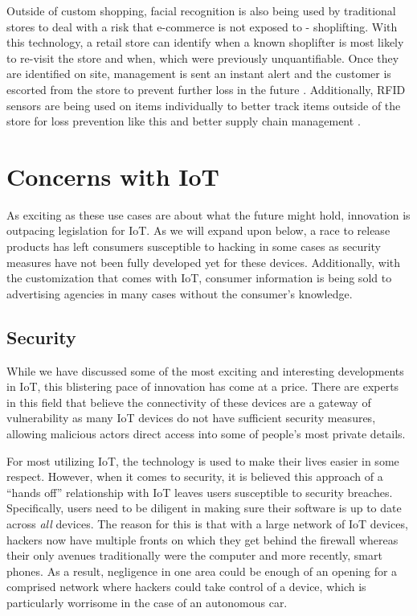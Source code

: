 \documentclass[sigconf]{acmart}
\begin{document}
Outside of custom shopping, facial recognition is also being used by traditional stores to deal with a risk that e-commerce is not exposed to - shoplifting. With this technology, a retail store can identify when a known shoplifter is most likely to re-visit the store and when, which were previously unquantifiable. Once they are identified on site, management is sent an instant alert and the customer is escorted from the store to prevent further loss in the future \cite{theftretail}. Additionally, RFID sensors are being used on items individually to better track items outside of the store for loss prevention like this and better supply chain management \cite{rfidretail}.

\section{Concerns with IoT}
As exciting as these use cases are about what the future might hold, innovation is outpacing legislation for IoT. As we will expand upon below, a race to release products has left consumers susceptible to hacking in some cases as security measures have not been fully developed yet for these devices. Additionally, with the customization that comes with IoT, consumer information is being sold to advertising agencies in many cases without the consumer's knowledge. 

\subsection{Security}
While we have discussed some of the most exciting and interesting developments in IoT, this blistering pace of innovation has come at a price. There are experts in this field that believe the connectivity of these devices are a gateway of vulnerability as many IoT devices do not have sufficient security measures, allowing malicious actors direct access into some of people's most private details. 

For most utilizing IoT, the technology is used to make their lives easier in some respect. However, when it comes to security, it is believed this approach of a ``hands off'' relationship with IoT leaves users susceptible to security breaches. Specifically, users need to be diligent in making sure their software is up to date across \emph{all} devices. The reason for this is that with a large network of IoT devices, hackers now have multiple fronts on which they get behind the firewall whereas their only avenues traditionally were the computer and more recently, smart phones. As a result, negligence in one area could be enough of an opening for a comprised network where hackers could take control of a device, which is particularly worrisome in the case of an autonomous car. 
\end{document}
